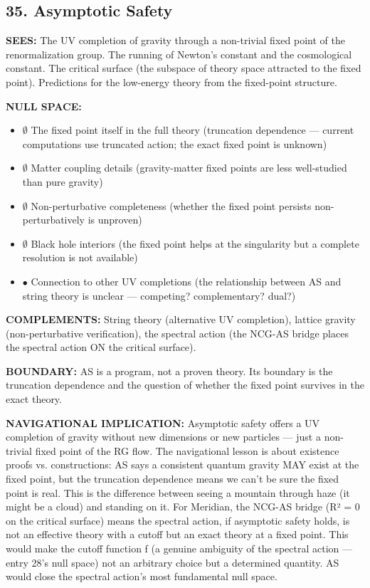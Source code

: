 \bigskip\noindent\makebox[\textwidth]{\color{rulegray}\rule{5cm}{0.3pt}}\bigskip


\subsection*{35. Asymptotic Safety}


\textbf{SEES:} The UV completion of gravity through a non-trivial fixed point of the renormalization group. The running of Newton's constant and the cosmological constant. The critical surface (the subspace of theory space attracted to the fixed point). Predictions for the low-energy theory from the fixed-point structure.


\textbf{NULL SPACE:}

\begin{itemize}[nosep,leftmargin=*]
  \item $\emptyset$ The fixed point itself in the full theory (truncation dependence — current computations use truncated action; the exact fixed point is unknown)
  \item $\emptyset$ Matter coupling details (gravity-matter fixed points are less well-studied than pure gravity)
  \item $\emptyset$ Non-perturbative completeness (whether the fixed point persists non-perturbatively is unproven)
  \item $\emptyset$ Black hole interiors (the fixed point helps at the singularity but a complete resolution is not available)
  \item $\bullet$ Connection to other UV completions (the relationship between AS and string theory is unclear — competing? complementary? dual?)
\end{itemize}


\textbf{COMPLEMENTS:} String theory (alternative UV completion), lattice gravity (non-perturbative verification), the spectral action (the NCG-AS bridge places the spectral action ON the critical surface).


\textbf{BOUNDARY:} AS is a program, not a proven theory. Its boundary is the truncation dependence and the question of whether the fixed point survives in the exact theory.


\textbf{NAVIGATIONAL IMPLICATION:} Asymptotic safety offers a UV completion of gravity without new dimensions or new particles — just a non-trivial fixed point of the RG flow. The navigational lesson is about existence proofs vs. constructions: AS says a consistent quantum gravity MAY exist at the fixed point, but the truncation dependence means we can't be sure the fixed point is real. This is the difference between seeing a mountain through haze (it might be a cloud) and standing on it. For Meridian, the NCG-AS bridge (R² = 0 on the critical surface) means the spectral action, if asymptotic safety holds, is not an effective theory with a cutoff but an exact theory at a fixed point. This would make the cutoff function f (a genuine ambiguity of the spectral action — entry 28's null space) not an arbitrary choice but a determined quantity. AS would close the spectral action's most fundamental null space.


